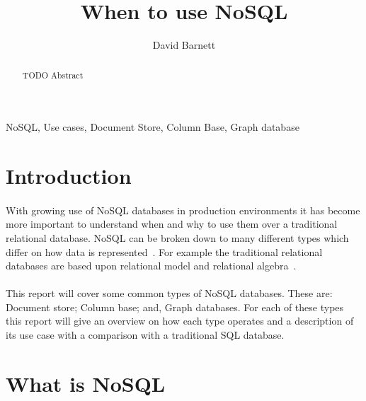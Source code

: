 \documentclass{CRPITStyle}
\renewcommand{\cite}{\citep}
\begin{document}
\title{When to use NoSQL}
\author{David Barnett}

\maketitle

\begin{abstract}
    TODO Abstract
\end{abstract}

\vspace{.1in}

 NoSQL, Use cases, Document Store, Column Base, Graph database

\section{Introduction}

\paragraph{} With growing use of NoSQL databases in production environments it has become more
important to understand when and why to use them over a traditional
relational database.
NoSQL can be broken down to many different types which differ on how
data is represented~\cite{type_nosql}.
For example the traditional relational databases are based upon relational
model and relational algebra~\cite{relational_db}. 

\paragraph{} This report will cover some common types of NoSQL databases.
These are: Document store; Column base; and, Graph databases.
For each of these types this report will give an overview on how each type 
operates and a description of its use case with a comparison with a 
traditional SQL database.

\cite{whats_new}
\cite{sql_nosql_gap}
\cite{scalable_sql}

\section{What is NoSQL}
\end{document}
